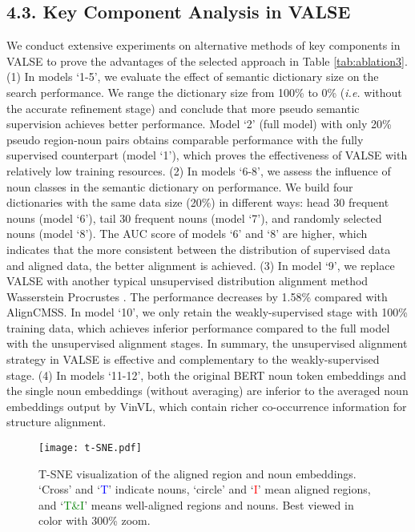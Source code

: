 \documentclass[letterpaper]{article} \usepackage{aaai24}  \usepackage{times}  \usepackage{helvet}  \usepackage{courier}  \usepackage[hyphens]{url}  \usepackage{graphicx} \urlstyle{rm} \def\UrlFont{\rm}  \usepackage{natbib}  \usepackage{caption} \frenchspacing  \setlength{\pdfpagewidth}{8.5in}  \setlength{\pdfpageheight}{11in}
\begin{document}
\subsection{4.3. Key Component Analysis in VALSE}
\label{ssec:align analysis}

We conduct extensive experiments on alternative methods of key components in VALSE to prove the advantages of the selected approach in Table \ref{tab:ablation3}.  
(1) In models ‘1-5’, we evaluate the effect of semantic dictionary size on the search performance. 
We range the dictionary size from 100\% to 0\% (\textit{i.e.} without the accurate refinement stage) and conclude that more pseudo semantic supervision achieves better performance. Model `2' (full model) with only 20\% pseudo region-noun pairs obtains comparable performance with the fully supervised counterpart (model `1'), which proves the effectiveness of VALSE with relatively low training resources. (2) In models ‘6-8’, we assess the influence of noun classes in the semantic dictionary on performance. We build four dictionaries with the same data size (20\%) in different ways: head 30 frequent nouns (model `6'), tail 30 frequent nouns (model `7'), and randomly selected nouns (model `8'). The AUC score of models `6’ and ‘8’ are higher, which indicates that the more consistent between the distribution of supervised data and aligned data, the better alignment is achieved. (3) In model ‘9’, we replace VALSE with another typical unsupervised distribution alignment method Wasserstein Procrustes \cite{grave2019unsupervised}. The performance decreases by 1.58\% compared with AlignCMSS. In model `10', we only retain the weakly-supervised stage with 100\% training data, which achieves inferior performance compared to the full model with the unsupervised alignment stages. In summary, the unsupervised alignment strategy in VALSE is effective and complementary to the weakly-supervised stage.
(4) In models ‘11-12’, both the original BERT noun token embeddings and the single noun embeddings (without averaging) are inferior to the averaged noun embeddings output by VinVL, which contain richer co-occurrence information for structure alignment.

\begin{figure}[t]
    \centering
\texttt{[image: t-SNE.pdf]}
\caption{T-SNE visualization of the aligned region and noun embeddings.  ‘Cross’ and ‘\textcolor{blue}{T}’ indicate nouns, ‘circle’ and ‘\textcolor{red}{I}’ mean aligned regions, and ‘\textcolor{green}{T\&I}’ means well-aligned regions and nouns.  Best viewed in color with 300\% zoom.}
    \vspace{-10pt}
    \label{fig:t-SNE}
\end{figure}
\end{document}
